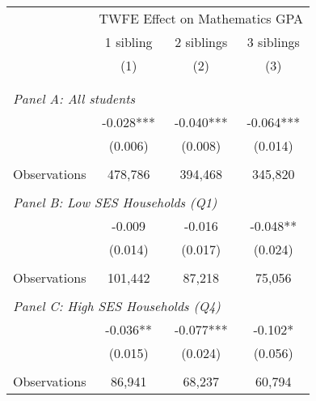 \makeatletter
{}
{
\makeatother
\begin{tabular}{lccc}
\toprule
\cmidrule(lr){2-4}
& \multicolumn{3}{c}{TWFE Effect on Mathematics GPA} \\
\cmidrule(lr){2-4}
& 1 sibling & 2 siblings & 3 siblings  \\
\cmidrule(lr){2-2} \cmidrule(lr){3-3} \cmidrule(lr){4-4}
& (1) & (2) & (3)\\
\bottomrule
&  &  &  \\
&  &  &   \\
\multicolumn{4}{l}{\textit{Panel A: All students}} \\
\hspace{3mm}        &      -0.028***&      -0.040***&      -0.064***\\
                    &     (0.006)   &     (0.008)   &     (0.014)   \\
                    &               &               &               \\
\hspace{3mm}Observations&     478,786   &     394,468   &     345,820   \\
 
&  &  &   \\
\multicolumn{4}{l}{\textit{Panel B: Low SES Households (Q1)}} \\
\hspace{3mm}        &      -0.009   &      -0.016   &      -0.048** \\
                    &     (0.014)   &     (0.017)   &     (0.024)   \\
                    &               &               &               \\
\hspace{3mm}Observations&     101,442   &      87,218   &      75,056   \\
 
&  &  &   \\
\multicolumn{4}{l}{\textit{Panel C: High SES Households (Q4)}} \\
\hspace{3mm}        &      -0.036** &      -0.077***&      -0.102*  \\
                    &     (0.015)   &     (0.024)   &     (0.056)   \\
                    &               &               &               \\
\hspace{3mm}Observations&      86,941   &      68,237   &      60,794   \\
 

\end{tabular}}
